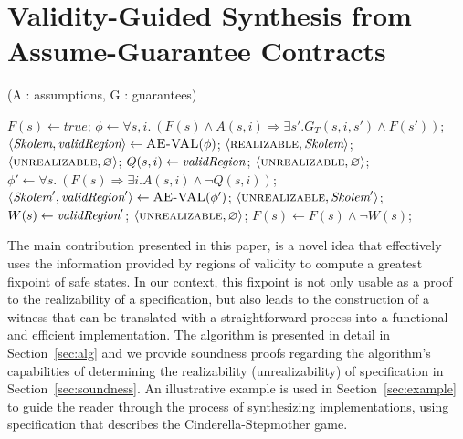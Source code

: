 \section{Validity-Guided Synthesis from Assume-Guarantee Contracts}
\label{sec:synthesis}

\begin{algorithm*}[!t]
\caption{\jsynvg (A : assumptions, G : guarantees)}
\label{alg:synthesis}
\begin{algorithmic}[1]
	\State $F(s) \gets true$;
		\State $\phi \gets \forall s,i. \ (F(s) \land A(s,i) \Rightarrow \exists s'.G_{T}(s,i,s') \land F(s'))$;
		\State $\langle \textit{Skolem}, \textit{validRegion} \rangle \gets \textsc{AE-VAL}(\phi)$;
		\If{$\isValid(\phi)$}
				\Return $\langle \textsc{realizable}, \textit{Skolem} \rangle$;
		 		\Return $\langle \textsc{unrealizable}, \varnothing \rangle$;
				\State
		 	\EndIf
			\State $Q(s,i) \gets \textit{validRegion}$;
				\Return $\langle \textsc{unrealizable}, \varnothing \rangle$;
				\State
			\EndIf
			\State $\phi' \gets \forall s. \ (F(s) \Rightarrow \exists i. A(s,i) \land \lnot
			Q(s,i))$;
			\State $\langle \textit{Skolem}', \textit{validRegion}' \rangle\gets \textsc{AE-VAL}(\phi')$;
				\Return $\langle \textsc{unrealizable}, \textit{Skolem}' \rangle$;
		        \State{}
			\Else{}
				\State $W(s) \gets \textit{validRegion}'$;
					\Return $\langle \textsc{unrealizable}, \varnothing \rangle$;
				\EndIf
				\State $F(s) \gets F(s) \land \lnot W(s)$;
			\EndIf
		\EndIf
	\EndWhile
\end{algorithmic}
\end{algorithm*}

The main contribution presented in this paper, is a novel idea that effectively
uses the information provided by regions of validity to compute a
greatest fixpoint of safe states. In our context, this fixpoint is not only
usable as a proof to the realizability of a specification, but also leads to the
construction of a witness that can be translated with a straightforward process
into a functional and efficient implementation. The algorithm is presented in detail in Section~\ref{sec:alg} and we provide soundness proofs regarding the algorithm's capabilities of determining the realizability (unrealizability) of specification in Section~\ref{sec:soundness}. An illustrative example is used in Section~\ref{sec:example} to guide the reader through the process of synthesizing implementations, using specification that describes the Cinderella-Stepmother game.

